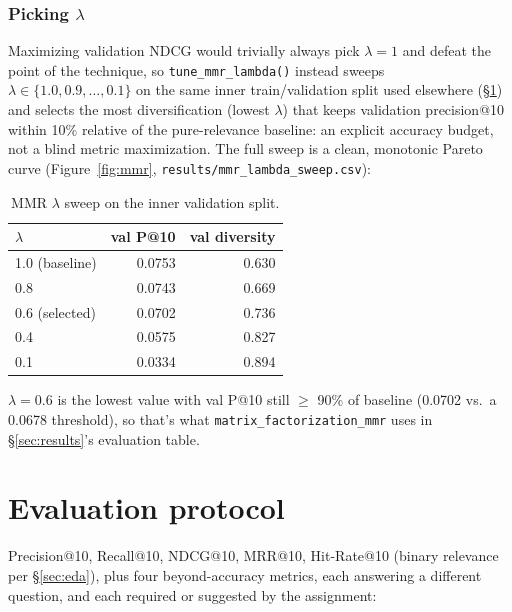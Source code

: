 \documentclass[11pt,a4paper]{article}
\newcommand{\code}[1]{\texttt{#1}}
\newcommand{\secref}[1]{\S\ref{#1}}
\begin{document}
\subsubsection{Picking \texorpdfstring{$\lambda$}{lambda}}

Maximizing validation NDCG would trivially always pick $\lambda = 1$ and defeat the point of the technique, so \code{tune\_mmr\_lambda()} instead sweeps $\lambda \in \{1.0, 0.9, \ldots, 0.1\}$ on the same inner train/validation split used elsewhere (\secref{sec:protocol}) and selects the most diversification (lowest $\lambda$) that keeps validation precision@10 within 10\% relative of the pure-relevance baseline: an explicit accuracy budget, not a blind metric maximization. The full sweep is a clean, monotonic Pareto curve (Figure~\ref{fig:mmr}, \code{results/mmr\_lambda\_sweep.csv}):

\begin{table}[!htbp]
\centering
\begin{tabular}{lrr}
\toprule
$\lambda$ & val P@10 & val diversity \\
\midrule
1.0 (baseline) & 0.0753 & 0.630 \\
0.8 & 0.0743 & 0.669 \\
0.6 (selected) & 0.0702 & 0.736 \\
0.4 & 0.0575 & 0.827 \\
0.1 & 0.0334 & 0.894 \\
\bottomrule
\end{tabular}
\caption{MMR $\lambda$ sweep on the inner validation split.}
\end{table}

$\lambda = 0.6$ is the lowest value with val P@10 still $\geq$ 90\% of baseline (0.0702 vs.\ a 0.0678 threshold), so that's what \code{matrix\_factorization\_mmr} uses in \secref{sec:results}'s evaluation table.

\section{Evaluation protocol}
\label{sec:protocol}

Precision@10, Recall@10, NDCG@10, MRR@10, Hit-Rate@10 (binary relevance per \secref{sec:eda}), plus four beyond-accuracy metrics, each answering a different question, and each required or suggested by the assignment:
\end{document}
